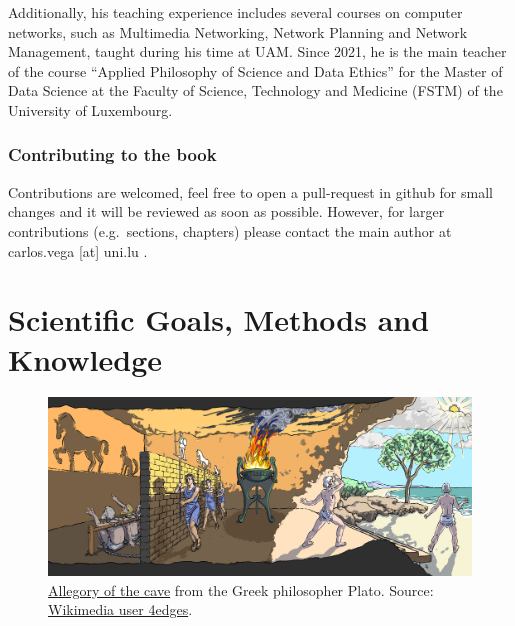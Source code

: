 \documentclass[
]{book}
\begin{document}
Additionally, his teaching experience includes several courses on computer networks, such as Multimedia Networking, Network Planning and Network Management, taught during his time at UAM. Since 2021, he is the main teacher of the course ``Applied Philosophy of Science and Data Ethics'' for the Master of Data Science at the Faculty of Science, Technology and Medicine (FSTM) of the University of Luxembourg.

\hypertarget{contributing-to-the-book}{%
\subsection*{Contributing to the book}\label{contributing-to-the-book}}

Contributions are welcomed, feel free to open a pull-request in github for small changes and it will be reviewed as soon as possible. However, for larger contributions (e.g.~sections, chapters) please contact the main author at carlos.vega {[}at{]} uni.lu .

\hypertarget{scientific-goals-methods-and-knowledge}{%
\chapter{Scientific Goals, Methods and Knowledge}\label{scientific-goals-methods-and-knowledge}}



\begin{figure}

{\centering \includegraphics[width=1\linewidth]{Figures/plato_cave} 

}

\caption{\href{https://en.wikipedia.org/wiki/Allegory_of_the_cave}{Allegory of the cave} from the Greek philosopher Plato. Source: \href{https://commons.wikimedia.org/wiki/File:An_Illustration_of_The_Allegory_of_the_Cave,_from_Plato’s_Republic.jpg}{Wikimedia user 4edges}.}\label{fig:pcave}
\end{figure}
\end{document}
